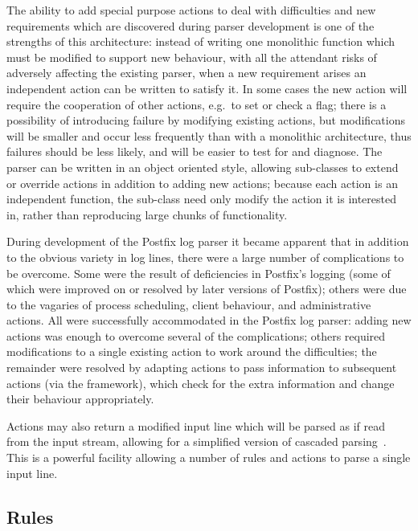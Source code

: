 \documentclass[draft]{svmult}
\begin{document}
The ability to add special purpose actions to deal with difficulties and
new requirements which are discovered during parser development is one of
the strengths of this architecture: instead of writing one monolithic
function which must be modified to support new behaviour, with all the
attendant risks of adversely affecting the existing parser, when a new
requirement arises an independent action can be written to satisfy it.  In
some cases the new action will require the cooperation of other actions,
e.g.\ to set or check a flag; there is a possibility of introducing failure
by modifying existing actions, but modifications will be smaller and occur
less frequently than with a monolithic architecture, thus failures should
be less likely, and will be easier to test for and diagnose.  The parser
can be written in an object oriented style, allowing sub-classes to extend
or override actions in addition to adding new actions; because each action
is an independent function, the sub-class need only modify the action it is
interested in, rather than reproducing large chunks of functionality.

During development of the Postfix log parser it became apparent that in
addition to the obvious variety in log lines, there were a large number of
complications to be overcome.  Some were the result of deficiencies in
Postfix's logging (some of which were improved on or resolved by later
versions of Postfix); others were due to the vagaries of process
scheduling, client behaviour, and administrative actions.  All were
successfully accommodated in the Postfix log parser: adding new actions was
enough to overcome several of the complications; others required
modifications to a single existing action to work around the difficulties;
the remainder were resolved by adapting actions to pass information to
subsequent actions (via the framework), which check for the extra
information and change their behaviour appropriately.

Actions may also return a modified input line which will be parsed as if
read from the input stream, allowing for a simplified version of cascaded
parsing~\cite{cascaded-parsing}.  This is a powerful facility allowing a
number of rules and actions to parse a single input line.

\subsection{Rules}

\label{Rules}
\end{document}
